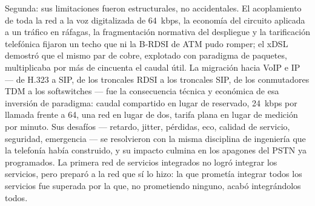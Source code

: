 \documentclass[12pt,a4paper]{article}
\begin{document}
Segunda: sus limitaciones fueron estructurales, no accidentales. El acoplamiento de toda la red a la voz digitalizada de 64~kbps, la economía del circuito aplicada a un tráfico en ráfagas, la fragmentación normativa del despliegue y la tarificación telefónica fijaron un techo que ni la B-RDSI de ATM pudo romper; el xDSL demostró que el mismo par de cobre, explotado con paradigma de paquetes, multiplicaba por más de cincuenta el caudal útil. La migración hacia VoIP e IP --- de H.323 a SIP, de los troncales RDSI a los troncales SIP, de los conmutadores TDM a los softswitches --- fue la consecuencia técnica y económica de esa inversión de paradigma: caudal compartido en lugar de reservado, 24~kbps por llamada frente a 64, una red en lugar de dos, tarifa plana en lugar de medición por minuto. Sus desafíos --- retardo, jitter, pérdidas, eco, calidad de servicio, seguridad, emergencia --- se resolvieron con la misma disciplina de ingeniería que la telefonía había construido, y su impacto culmina en los apagones del PSTN ya programados. La primera red de servicios integrados no logró integrar los servicios, pero preparó a la red que sí lo hizo: la que prometía integrar todos los servicios fue superada por la que, no prometiendo ninguno, acabó integrándolos todos.
\end{document}
